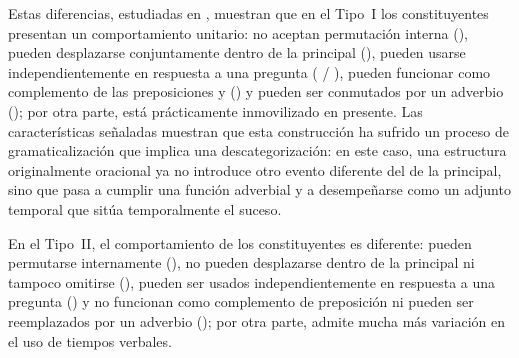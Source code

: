 \begin{recuadro}
Estas diferencias, estudiadas en \textcite{giammatteo2002}, muestran que en el
Tipo~I los constituyentes presentan un comportamiento unitario: no aceptan
permutación interna (), pueden desplazarse conjuntamente dentro de la principal
(), pueden usarse independientemente en respuesta a una pregunta
( /
), pueden funcionar como
complemento de las preposiciones  y  () y pueden ser conmutados por un adverbio
(); por otra parte,
 está prácticamente inmovilizado en presente. Las características
señaladas muestran que esta construcción ha sufrido un proceso de
gramaticalización que implica una descategorización: en este caso, una estructura
originalmente oracional ya no introduce otro evento diferente del de la
principal, sino que pasa a cumplir una función adverbial y a desempeñarse como un
adjunto temporal que sitúa temporalmente el suceso.

En el Tipo~II, el comportamiento de los constituyentes es diferente: pueden
permutarse internamente (),
no pueden desplazarse dentro de la principal ni tampoco omitirse
(), pueden ser
usados independientemente en respuesta a una pregunta () y no funcionan como complemento de preposición ni pueden
ser reemplazados por un adverbio (); por otra parte,  admite mucha más variación
en el uso de tiempos verbales.


\end{recuadro}

